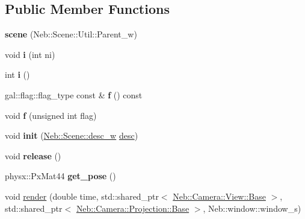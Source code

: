\subsection*{\-Public \-Member \-Functions}
\begin{DoxyCompactItemize}
\item 
\hypertarget{classNeb_1_1Scene_1_1scene_a5aac946d5a2c42170408c420c83e6d29}{{\bfseries scene} (\-Neb\-::\-Scene\-::\-Util\-::\-Parent\-\_\-w)}\label{classNeb_1_1Scene_1_1scene_a5aac946d5a2c42170408c420c83e6d29}

\item 
\hypertarget{classNeb_1_1Scene_1_1scene_a7babf57e9eed949b8baa3d299379cd29}{void {\bfseries i} (int ni)}\label{classNeb_1_1Scene_1_1scene_a7babf57e9eed949b8baa3d299379cd29}

\item 
\hypertarget{classNeb_1_1Scene_1_1scene_a1a0254f882a47ea24774fd3e1f692a4b}{int {\bfseries i} ()}\label{classNeb_1_1Scene_1_1scene_a1a0254f882a47ea24774fd3e1f692a4b}

\item 
\hypertarget{classNeb_1_1Scene_1_1scene_adc3f8123164d445df8fbde1a83d472b6}{gal\-::flag\-::flag\-\_\-type const \& {\bfseries f} () const }\label{classNeb_1_1Scene_1_1scene_adc3f8123164d445df8fbde1a83d472b6}

\item 
\hypertarget{classNeb_1_1Scene_1_1scene_aecc76635610cd2ea3112895b60f0132e}{void {\bfseries f} (unsigned int flag)}\label{classNeb_1_1Scene_1_1scene_aecc76635610cd2ea3112895b60f0132e}

\item 
\hypertarget{classNeb_1_1Scene_1_1scene_ac860eb679145b1f118f9313feb1c0469}{void {\bfseries init} (\hyperlink{classNeb_1_1weak__ptr}{\-Neb\-::\-Scene\-::desc\-\_\-w} \hyperlink{classNeb_1_1Scene_1_1desc}{desc})}\label{classNeb_1_1Scene_1_1scene_ac860eb679145b1f118f9313feb1c0469}

\item 
\hypertarget{classNeb_1_1Scene_1_1scene_a8ec471d1c306b99079dfd27485b07c5b}{void {\bfseries release} ()}\label{classNeb_1_1Scene_1_1scene_a8ec471d1c306b99079dfd27485b07c5b}

\item 
\hypertarget{classNeb_1_1Scene_1_1scene_abf6fb5b9ce4eea915727f79de015aacb}{physx\-::\-Px\-Mat44 {\bfseries get\-\_\-pose} ()}\label{classNeb_1_1Scene_1_1scene_abf6fb5b9ce4eea915727f79de015aacb}

\item 
\hypertarget{classNeb_1_1Scene_1_1scene_a0fc6c038957d7e92e1584494bf36f9b4}{void \hyperlink{classNeb_1_1Scene_1_1scene_a0fc6c038957d7e92e1584494bf36f9b4}{render} (double time, std\-::shared\-\_\-ptr$<$ \hyperlink{classNeb_1_1Camera_1_1View_1_1Base}{\-Neb\-::\-Camera\-::\-View\-::\-Base} $>$, std\-::shared\-\_\-ptr$<$ \hyperlink{classNeb_1_1Camera_1_1Projection_1_1Base}{\-Neb\-::\-Camera\-::\-Projection\-::\-Base} $>$, \-Neb\-::window\-::window\-\_\-s)}\label{classNeb_1_1Scene_1_1scene_a0fc6c038957d7e92e1584494bf36f9b4}


\end{DoxyCompactItemize}
